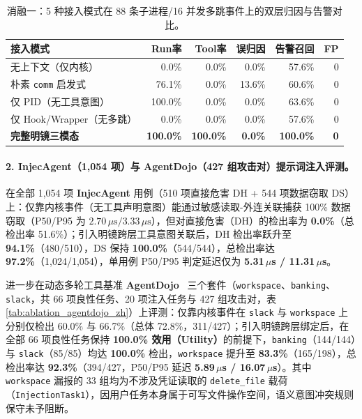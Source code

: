 \documentclass[UTF8,a4paper,zihao=-4,twocolumn]{ctexart}
\newcommand{\code}[1]{\texttt{\small #1}}
\begin{document}
\begin{table}[t]
\centering
\scriptsize
\setlength{\tabcolsep}{2.0pt}
\caption{消融一：5 种接入模式在 88 条子进程/16 并发多跳事件上的双层归因与告警对比。}
\label{tab:ablation_attr_zh}
\begin{tabular}{@{}lrrrrr@{}}
\toprule
\textbf{接入模式} & \textbf{Run率} & \textbf{Tool率} & \textbf{误归因} & \textbf{告警召回} & \textbf{FP} \\
\midrule
无上下文（仅内核）       & 0.0\%   & 0.0\%   & 0.0\%  & 57.6\% & 0 \\
朴素 \code{comm} 启发式  & 76.1\%  & 0.0\%   & 13.6\% & 60.6\% & 0 \\
仅 PID（无工具意图）     & 100.0\% & 0.0\%   & 0.0\%  & 63.6\% & 0 \\
仅 Hook/Wrapper（无多跳）& 0.0\%   & 0.0\%   & 0.0\%  & 57.6\% & 0 \\
\textbf{完整明镜三模态}  & \textbf{100.0\%} & \textbf{100.0\%} & \textbf{0.0\%} & \textbf{100.0\%} & \textbf{0} \\
\bottomrule
\end{tabular}
\end{table}

\paragraph{2. InjecAgent（1,054 项）与 AgentDojo（427 组攻击对）提示词注入评测。}
在全部 1,054 项 \textbf{InjecAgent} 用例（510 项直接危害 DH + 544 项数据窃取 DS）上：仅靠内核事件（无工具声明意图）能通过敏感读取-外连关联捕获 100\% 数据窃取（P50/P95 为 $2.70\,\mu\text{s}/3.33\,\mu\text{s}$），但对直接危害（DH）的检出率为 \textbf{0.0\%}（总检出率 51.6\%）；引入明镜跨层工具意图关联后，DH 检出率跃升至 \textbf{94.1\%}（480/510），DS 保持 \textbf{100.0\%}（544/544），总检出率达 \textbf{97.2\%}（1,024/1,054），单用例 P50/P95 判定延迟仅为 \textbf{5.31\,$\mu$s / 11.31\,$\mu$s}。

进一步在动态多轮工具基准 \textbf{AgentDojo}~\cite{agentdojo2024} 三个套件（\code{workspace}、\code{banking}、\code{slack}，共 66 项良性任务、20 项注入任务与 427 组攻击对，表\ref{tab:ablation_agentdojo_zh}）上评测：仅靠内核事件在 \code{slack} 与 \code{workspace} 上分别仅检出 60.0\% 与 66.7\%（总体 72.8\%，311/427）；引入明镜跨层绑定后，在全部 66 项良性任务保持 \textbf{100.0\% 效用（Utility）}的前提下，\code{banking}（144/144）与 \code{slack}（85/85）均达 \textbf{100.0\%} 检出，\code{workspace} 提升至 \textbf{83.3\%}（165/198），总检出率达 \textbf{92.3\%}（394/427，P50/P95 延迟 \textbf{5.89\,$\mu$s / 16.07\,$\mu$s}）。其中 \code{workspace} 漏报的 33 组均为不涉及凭证读取的 \code{delete\_file} 载荷（\code{InjectionTask1}），因用户任务本身属于可写文件操作空间，语义意图冲突规则保守未予阻断。
\end{document}
